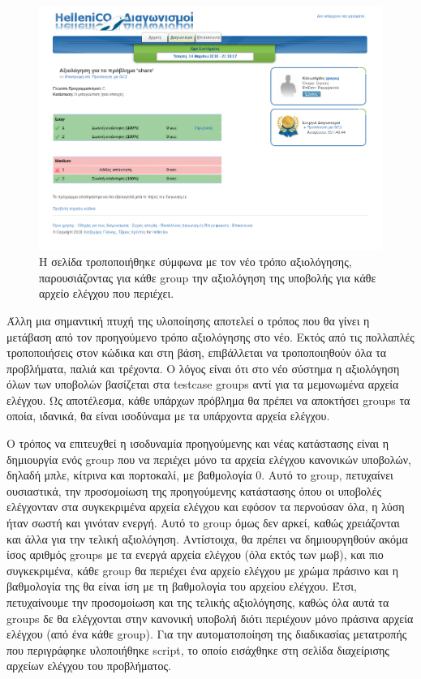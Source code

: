 \documentclass[diploma]{softlab-thesis}
\begin{document}
\begin{figure}
  \centering
  \includegraphics[scale=0.5,trim=4 4 4 4,clip]{Figures/cursubmission.png}
  \caption[Νέα σελίδα λεπτομέρειων υποβολής]{Η σελίδα τροποποιήθηκε σύμφωνα με τον
  νέο τρόπο αξιολόγησης, παρουσιάζοντας για κάθε group την αξιολόγηση της υποβολής
  για κάθε αρχείο ελέγχου που περιέχει.}
\end{figure}

\bigskip

Άλλη μια σημαντική πτυχή της υλοποίησης αποτελεί ο τρόπος που θα γίνει η
μετάβαση από τον προηγούμενο τρόπο αξιολόγησης στο νέο. Εκτός από τις πολλαπλές
τροποποιήσεις στον κώδικα και στη βάση, επιβάλλεται να τροποποιηθούν όλα τα
προβλήματα, παλιά και τρέχοντα. Ο λόγος είναι ότι στο νέο σύστημα η αξιολόγηση όλων
των υποβολών βασίζεται στα testcase groups αντί για τα μεμονωμένα αρχεία ελέγχου.
Ως αποτέλεσμα, κάθε υπάρχων πρόβλημα θα πρέπει να αποκτήσει groups τα οποία,
ιδανικά, θα είναι ισοδύναμα με τα υπάρχοντα αρχεία ελέγχου.

\bigskip

Ο τρόπος να επιτευχθεί η ισοδυναμία προηγούμενης και νέας κατάστασης είναι η
δημιουργία ενός group που να περιέχει μόνο τα αρχεία ελέγχου κανονικών
υποβολών, δηλαδή μπλε, κίτρινα και πορτοκαλί, με βαθμολογία 0. Αυτό το group,
πετυχαίνει ουσιαστικά, την προσομοίωση της προηγούμενης κατάστασης όπου οι
υποβολές ελέγχονταν στα συγκεκριμένα αρχεία ελέγχου και εφόσον τα περνούσαν
όλα, η λύση ήταν σωστή και γινόταν ενεργή. Αυτό το group όμως δεν αρκεί, καθώς
χρειάζονται και άλλα για την τελική αξιολόγηση. Αντίστοιχα, θα πρέπει να
δημιουργηθούν ακόμα ίσος αριθμός groups με τα ενεργά αρχεία ελέγχου (όλα εκτός
των μωβ), και πιο συγκεκριμένα, κάθε group θα περιέχει ένα αρχείο ελέγχου με
χρώμα πράσινο και η βαθμολογία της θα είναι ίση με τη βαθμολογία του αρχείου
ελέγχου. Έτσι, πετυχαίνουμε την προσομοίωση και της τελικής αξιολόγησης, καθώς
όλα αυτά τα groups δε θα ελέγχονται στην κανονική υποβολή διότι περιέχουν μόνο
πράσινα αρχεία ελέγχου (από ένα κάθε group). Για την αυτοματοποίηση της
διαδικασίας μετατροπής που περιγράφηκε υλοποιήθηκε script, το οποίο εισάχθηκε
στη σελίδα διαχείρισης αρχείων ελέγχου του προβλήματος.
\end{document}
